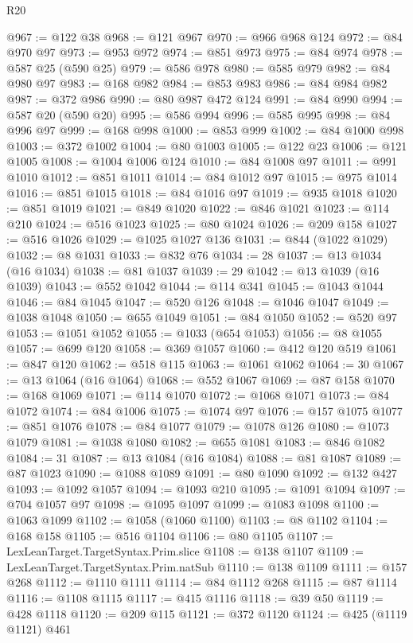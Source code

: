 \begin{lexlean}{R20}
\begin{coremodule}
@967 := @122 @38
@968 := @121 @967
@970 := @966 @968 @124
@972 := @84 @970 @97
@973 := @953 @972
@974 := @851 @973
@975 := @84 @974
@978 := @587 @25 (@590 @25)
@979 := @586 @978
@980 := @585 @979
@982 := @84 @980 @97
@983 := @168 @982
@984 := @853 @983
@986 := @84 @984 @982
@987 := @372 @986
@990 := @80 @987 @472 @124
@991 := @84 @990
@994 := @587 @20 (@590 @20)
@995 := @586 @994
@996 := @585 @995
@998 := @84 @996 @97
@999 := @168 @998
@1000 := @853 @999
@1002 := @84 @1000 @998
@1003 := @372 @1002
@1004 := @80 @1003
@1005 := @122 @23
@1006 := @121 @1005
@1008 := @1004 @1006 @124
@1010 := @84 @1008 @97
@1011 := @991 @1010
@1012 := @851 @1011
@1014 := @84 @1012 @97
@1015 := @975 @1014
@1016 := @851 @1015
@1018 := @84 @1016 @97
@1019 := @935 @1018
@1020 := @851 @1019
@1021 := @849 @1020
@1022 := @846 @1021
@1023 := @114 @210
@1024 := @516 @1023
@1025 := @80 @1024
@1026 := @209 @158
@1027 := @516 @1026
@1029 := @1025 @1027 @136
@1031 := @844 (@1022 @1029)
@1032 := @8 @1031
@1033 := @832 @76
@1034 := 28
@1037 := @13 @1034 (@16 @1034)
@1038 := @81 @1037
@1039 := 29
@1042 := @13 @1039 (@16 @1039)
@1043 := @552 @1042
@1044 := @114 @341
@1045 := @1043 @1044
@1046 := @84 @1045
@1047 := @520 @126
@1048 := @1046 @1047
@1049 := @1038 @1048
@1050 := @655 @1049
@1051 := @84 @1050
@1052 := @520 @97
@1053 := @1051 @1052
@1055 := @1033 (@654 @1053)
@1056 := @8 @1055
@1057 := @699 @120
@1058 := @369 @1057
@1060 := @412 @120 @519
@1061 := @847 @120
@1062 := @518 @115
@1063 := @1061 @1062
@1064 := 30
@1067 := @13 @1064 (@16 @1064)
@1068 := @552 @1067
@1069 := @87 @158
@1070 := @168 @1069
@1071 := @114 @1070
@1072 := @1068 @1071
@1073 := @84 @1072
@1074 := @84 @1006
@1075 := @1074 @97
@1076 := @157 @1075
@1077 := @851 @1076
@1078 := @84 @1077
@1079 := @1078 @126
@1080 := @1073 @1079
@1081 := @1038 @1080
@1082 := @655 @1081
@1083 := @846 @1082
@1084 := 31
@1087 := @13 @1084 (@16 @1084)
@1088 := @81 @1087
@1089 := @87 @1023
@1090 := @1088 @1089
@1091 := @80 @1090
@1092 := @132 @427
@1093 := @1092 @1057
@1094 := @1093 @210
@1095 := @1091 @1094
@1097 := @704 @1057 @97
@1098 := @1095 @1097
@1099 := @1083 @1098
@1100 := @1063 @1099
@1102 := @1058 (@1060 @1100)
@1103 := @8 @1102
@1104 := @168 @158
@1105 := @516 @1104
@1106 := @80 @1105
@1107 := LexLeanTarget.TargetSyntax.Prim.slice
@1108 := @138 @1107
@1109 := LexLeanTarget.TargetSyntax.Prim.natSub
@1110 := @138 @1109
@1111 := @157 @268
@1112 := @1110 @1111
@1114 := @84 @1112 @268
@1115 := @87 @1114
@1116 := @1108 @1115
@1117 := @415 @1116
@1118 := @39 @50
@1119 := @428 @1118
@1120 := @209 @115
@1121 := @372 @1120
@1124 := @425 (@1119 @1121) @461

\end{coremodule}
\end{lexlean}
